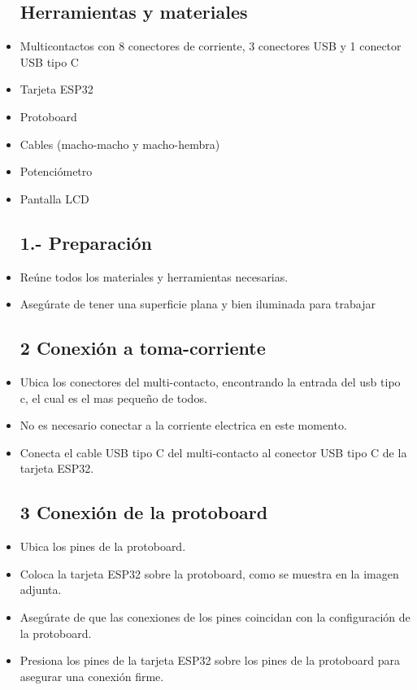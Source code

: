     \begin{itemize}
        \subsection{Herramientas y materiales}
        
        \item Multicontactos con 8 conectores de corriente, 3 conectores USB y 1 conector USB tipo C
        \item Tarjeta ESP32
        \item Protoboard
        \item Cables (macho-macho y macho-hembra)
        \item Potenciómetro
        \item Pantalla LCD  
    
        \subsection{1.- Preparación }
        \item Reúne todos los materiales y herramientas necesarias.
        \item Asegúrate de tener una superficie plana y bien iluminada para trabajar
    
        \subsection{2 Conexión a toma-corriente }
        \item Ubica los conectores del multi-contacto, encontrando la entrada del usb tipo c, el cual es el mas pequeño de todos.
        \item No es necesario conectar a la corriente electrica en este momento.
        \item Conecta el cable USB tipo C del multi-contacto al conector USB tipo C de la tarjeta ESP32.
    
        \subsection{3 Conexión de la protoboard }
        \item Ubica los pines de la protoboard.
        \item Coloca la tarjeta ESP32 sobre la protoboard, como se muestra en la imagen adjunta.
        \item Asegúrate de que las conexiones de los pines coincidan con la configuración de la protoboard.
         \item Presiona los pines de la tarjeta ESP32 sobre los pines de la protoboard para asegurar una conexión firme.
    

\end{itemize}

